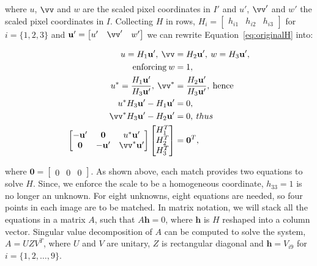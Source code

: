 \documentclass[12pt]{article}
\begin{document}
where $u$, $\vv$ and $w$ are the scaled pixel coordinates in $I'$ and $u'$, $\vv'$ and $w'$ the scaled pixel coordinates in $I$.
Collecting $H$ in rows, $H_i = \begin{bmatrix} h_{i1} & h_{i2} & h_{i3} \end{bmatrix}$ for $i = \lbrace 1,2,3 \rbrace$ and $\mathbf{u'} = \begin{bmatrix} u' & \vv' & w' \end{bmatrix}$ we can rewrite Equation~\ref{eq:originalH} into:

\begin{equation}
\begin{aligned}
	u = H_1 \mathbf{u'}, \: \vv &= H_2 \mathbf{u'}, \: w = H_3 \mathbf{u'}, \\ 
	\text{enforcing} \: w &= 1, \\
	u^* = \frac{H_1 \mathbf{u'}}{ H_3 \mathbf{u'}}, \: \vv^* &= \frac{H_2 \mathbf{u'}}{ H_3 \mathbf{u'}}, \: \text{hence} \\	
	u^*H_3\mathbf{u'} - H_1\mathbf{u'} &= 0, \\
	\vv^* H_3\mathbf{u'} - H_2\mathbf{u'} &= 0, \: thus\\
	\begin{bmatrix}
	-\mathbf{u'} & \mathbf{0} & u^*\mathbf{u'} \\
	\mathbf{0} & -\mathbf{u'} & \vv^*\mathbf{u'}
	\end{bmatrix}
	\begin{bmatrix}
	H_1^T \\
	H_2^T \\ 
	H_3^T 
	\end{bmatrix}
	&= \mathbf{0}^T,
\end{aligned}
\label{eq:derivatingH}
\end{equation}

where $\mathbf{0} = \begin{bmatrix} 0 & 0 & 0 \end{bmatrix}$. 
As shown above, each match provides two equations to solve $H$.
Since, we enforce the scale to be a homogeneous coordinate, $h_{33} = 1$ is no longer an unknown.
For eight unknowns, eight equations are needed, so four points in each image are to be matched.
In matrix notation, we will stack all the equations in a matrix $A$, such that $A\mathbf{h}=0$, where $\mathbf{h}$ is $H$ reshaped into a column vector.
Singular value decomposition of $A$ can be computed to solve the system, $A = UZV^T$, where $U$ and $V$ are unitary, $Z$ is rectangular diagonal and $\mathbf{h} = V_{i9}$ for $i = \lbrace 1,2, \ldots, 9 \rbrace$.
\end{document}
